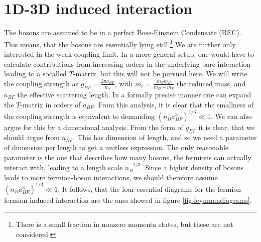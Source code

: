 \section{1D-3D induced interaction}
The bosons are assumed to be in a perfect Bose-Einstein Condensate (BEC). This means, that the bosons are essentially lying still.\footnote{There is a small fraction in nonzero momenta states, but these are not considered.}  We are further only interested in the weak coupling limit. In a more general setup, one would have to calculate contributions from increasing orders in the underlying bare interaction leading to a socalled $T$-matrix, but this will not be pursued here. We will write the coupling strength as $g_{BF} = \frac{2\pi a_{BF}}{m_r}$, with $m_r = \frac{m_Fm_B}{m_B + m_F}$ the reduced mass, and $a_{BF}$ the effective scattering length. In a formally precise manner one can expand the $T$-matrix in orders of $a_{BF}$. From this analysis, it is clear that the smallness of the coupling strength is equivalent to demanding $(n_Ba_{BF}^3)^{1/3}\ll 1$. We can also argue for this by a dimensional analysis. From the form of $g_{BF}$ it is clear, that we should argue from $a_{BF}$. This has dimension of length, and so we need a parameter of dimension per length to get a unitless expression. The only reasonable parameter is the one that describes how many bosons, the fermions can actually interact with, leading to a length scale $n_B^{-1/3}$. Since a higher density of bosons leads to more fermion-boson interactions, we should therefore assume $(n_Ba_{BF}^3)^{1/3} \ll 1$. It follows, that the four essential diagrams for the fermion-fermion induced interaction are the ones showed in figure \ref{fig.feynmandiagrams}. 

